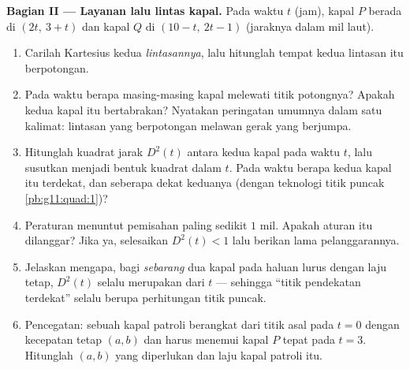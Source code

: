 \begin{problem}
\medskip
\noindent\textbf{Bagian II --- Layanan lalu lintas kapal.}
Pada waktu $t$ (jam), kapal $P$ berada di $(2t,\ 3 + t)$ dan kapal $Q$
di $(10 - t,\ 2t - 1)$ (jaraknya dalam mil laut).
\begin{enumerate}[resume]
  \item Carilah  Kartesius kedua \emph{lintasannya},
        lalu hitunglah tempat kedua lintasan itu berpotongan.
  \item Pada waktu berapa masing-masing kapal melewati titik potongnya?
        Apakah kedua kapal itu bertabrakan? Nyatakan peringatan umumnya dalam
        satu kalimat: lintasan yang berpotongan melawan gerak yang berjumpa.
  \item Hitunglah kuadrat jarak $D^2(t)$ antara kedua kapal
        pada waktu $t$, lalu susutkan menjadi bentuk kuadrat dalam $t$. Pada
        waktu berapa kedua kapal itu terdekat, dan seberapa dekat
        keduanya (dengan teknologi titik puncak \cref{pb:g11:quad:1})?
  \item Peraturan menuntut pemisahan paling sedikit $1$ mil.
        Apakah aturan itu dilanggar? Jika ya, selesaikan $D^2(t) < 1$ lalu
        berikan lama pelanggarannya.
  \item Jelaskan mengapa, bagi \emph{sebarang} dua kapal pada
        haluan lurus dengan laju tetap, $D^2(t)$ selalu merupakan  dari $t$ --- sehingga ``titik pendekatan terdekat''
        selalu berupa perhitungan titik puncak.
  \item Pencegatan: sebuah kapal patroli berangkat dari titik asal pada
        $t = 0$ dengan kecepatan tetap $(a, b)$ dan harus menemui
        kapal $P$ tepat pada $t = 3$. Hitunglah
        $(a, b)$ yang diperlukan dan laju kapal patroli itu.
\end{enumerate}


\end{problem}
